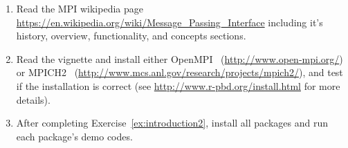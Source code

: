 \begin{enumerate}[label=\thechapter-\arabic*]
\item
Read the MPI wikipedia page \url{https://en.wikipedia.org/wiki/Message_Passing_Interface}
including it's history, overview, functionality, and concepts sections.

\item
Read the  vignette and install either
OpenMPI~ (\url{http://www.open-mpi.org/}) or
MPICH2~
(\url{http://www.mcs.anl.gov/research/projects/mpich2/}),
 and test if the installation is correct (see \url{http://www.r-pbd.org/install.html} for more details).
\label{ex:introduction2}

\item
After completing Exercise~\ref{ex:introduction2},
install all  packages and run each package's demo codes.
\end{enumerate}

